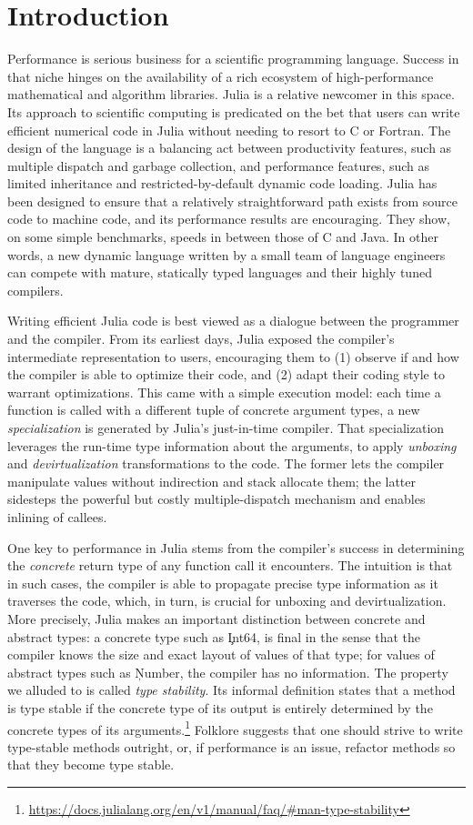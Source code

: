 \chapter{Introduction}%

Performance is serious business for a scientific programming language. Success
in that niche hinges on the availability of a rich ecosystem of high-performance
mathematical and algorithm libraries. Julia is a relative newcomer in this space.
Its approach to scientific computing is predicated on the bet that
users can write efficient numerical code in Julia without needing to resort to C
or Fortran.
%
The design of the language is a balancing act between productivity features, such
as multiple dispatch and garbage collection, and performance features, such as
limited inheritance and restricted-by-default dynamic code loading.
Julia has been designed to ensure that a
relatively straightforward path exists from source code to machine code,
and its performance results are encouraging. They show, on some simple benchmarks,
speeds in between those of C and Java. In other words, a new dynamic language
written by a small team of language engineers can compete with mature, statically
typed languages and their highly tuned compilers.

Writing efficient Julia code is best viewed as a dialogue between the programmer
and the compiler.
From its earliest days, Julia exposed the compiler's intermediate representation
to users, encouraging them to (1) observe if and how the compiler is able to optimize
their code, and (2) adapt their coding style to warrant optimizations. This came with a
simple execution model: each time a function is called with a different tuple of
concrete argument types, a new \emph{specialization} is generated by Julia's
just-in-time compiler. That specialization leverages the run-time type information
about the arguments, to apply \emph{unboxing} and \emph{devirtualization} transformations
to the code. The former lets the compiler manipulate values without indirection
and stack allocate them; the latter sidesteps the powerful but costly
multiple-dispatch mechanism and enables inlining of callees.

One key to performance in Julia
stems from the compiler's success in determining the \emph{concrete} return
type of any function call it encounters. The intuition is that in such cases,
the compiler is able to propagate precise type information as it traverses the
code, which, in turn, is crucial for unboxing and devirtualization.
More precisely, Julia makes an important distinction between
concrete and abstract types: a concrete type such as \c{Int64}, is final
in the sense that the compiler knows the size and exact layout of
values of that type; for values of abstract types such as \c{Number}, the compiler has
no information. The property we alluded to is called \emph{type stability}.
Its informal definition states that a method is type stable if the concrete type of its
output is entirely determined by the concrete types of its arguments.\footnote{
\url{https://docs.julialang.org/en/v1/manual/faq/\#man-type-stability}} Folklore
suggests that one should strive to write type-stable methods outright, or, if
performance is an issue, refactor methods so that they become type stable.


